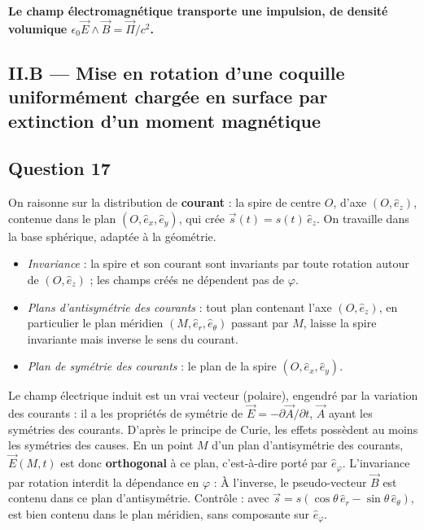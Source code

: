 \documentclass[11pt,a4paper]{article}
\providecommand{\tightlist}{\setlength{\itemsep}{0pt}\setlength{\parskip}{0pt}}
\newcommand{\equationajustee}[1]{%
  \sbox{\boiteequation}{$\displaystyle #1$}%
  \ifdim\wd\boiteequation>\linewidth
    \[\resizebox{\linewidth}{!}{\usebox{\boiteequation}}\]%
  \else
    \[#1\]%
  \fi}
\begin{document}
\textbf{Le champ électromagnétique transporte une impulsion, de densité volumique \(\epsilon_0\vec E\wedge\vec B=\vec\Pi/c^2\).}

\hypertarget{ii.b-mise-en-rotation-dune-coquille-uniformuxe9ment-charguxe9e-en-surface-par-extinction-dun-moment-magnuxe9tique}{%
\subsection{II.B --- Mise en rotation d'une coquille uniformément chargée en surface par extinction d'un moment magnétique}\label{ii.b-mise-en-rotation-dune-coquille-uniformuxe9ment-charguxe9e-en-surface-par-extinction-dun-moment-magnuxe9tique}}

\hypertarget{question-17}{%
\subsection{Question 17}\label{question-17}}

On raisonne sur la distribution de \textbf{courant} : la spire de centre \(O\), d'axe \((O,\hat e_z)\), contenue dans le plan \((O,\hat e_x,\hat e_y)\), qui crée \(\vec s(t)=s(t)\,\hat e_z\). On travaille dans la base sphérique, adaptée à la géométrie.

\begin{itemize}
\tightlist
\item
  \emph{Invariance} : la spire et son courant sont invariants par toute rotation autour de \((O,\hat e_z)\) ; les champs créés ne dépendent pas de \(\varphi\).
\item
  \emph{Plans d'antisymétrie des courants} : tout plan contenant l'axe \((O,\hat e_z)\), en particulier le plan méridien \((M,\hat e_r,\hat e_\theta)\) passant par \(M\), laisse la spire invariante mais inverse le sens du courant.
\item
  \emph{Plan de symétrie des courants} : le plan de la spire \((O,\hat e_x,\hat e_y)\).
\end{itemize}

Le champ électrique induit est un vrai vecteur (polaire), engendré par la variation des courants : il a les propriétés de symétrie de \(\vec E=-\partial\vec A/\partial t\), \(\vec A\) ayant les symétries des courants. D'après le principe de Curie, les effets possèdent au moins les symétries des causes. En un point \(M\) d'un plan d'antisymétrie des courants, \(\vec E(M,t)\) est donc \textbf{orthogonal} à ce plan, c'est-à-dire porté par \(\hat e_\varphi\). L'invariance par rotation interdit la dépendance en \(\varphi\) :
\equationajustee{\boxed{\vec E(M,t)=E_\varphi(r,\theta,t)\,\hat e_\varphi}}
À l'inverse, le pseudo-vecteur \(\vec B\) est contenu dans ce plan d'antisymétrie. Contrôle : avec \(\vec s=s(\cos\theta\,\hat e_r-\sin\theta\,\hat e_\theta)\),
\equationajustee{\vec B=\frac{\mu_0s}{4\pi r^3}\left(2\cos\theta\,\hat e_r+\sin\theta\,\hat e_\theta\right)}
est bien contenu dans le plan méridien, sans composante sur \(\hat e_\varphi\).
\end{document}
